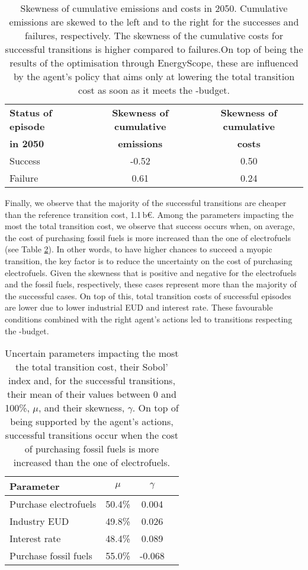 \begin{table}[htbp!]
\caption{Skewness of cumulative emissions and costs in 2050. Cumulative emissions are skewed to the left and to the right for the successes and failures, respectively. The skewness of the cumulative costs for successful transitions is higher compared to failures.On top of being the results of the optimisation through EnergyScope, these are influenced by the agent's policy that aims only at lowering the total transition cost as soon as it meets the -budget.}
\label{tab:skewness_gwp_cost}
\centering
\begin{tabular}{l c c}
\toprule
\textbf{Status of episode}  & \textbf{Skewness of cumulative} & \textbf{Skewness of cumulative} \\
\textbf{in 2050}  & \textbf{emissions} & \textbf{costs} \\	
\midrule
Success & -0.52 & 0.50 \\
Failure & 0.61 & 0.24 \\
\bottomrule							

\end{tabular}
\end{table}

Finally, we observe that the majority of the successful transitions are cheaper than the reference transition cost, 1.1\,b€. Among the parameters impacting the most the total transition cost, we observe that success occurs when, on average,  the cost of purchasing fossil fuels is more increased than the one of electrofuels (see Table \ref{tab:param_RL}). In other words, to have higher chances to succeed a myopic transition, the key factor is to reduce the uncertainty on the cost of purchasing electrofuels. Given the skewness that is positive and negative for the electrofuels and the fossil fuels, respectively, these cases represent more than the majority of the successful cases. On top of this, total transition costs of successful episodes are lower due to lower industrial \gls{EUD} and interest rate. These favourable conditions combined with the right agent's actions led to transitions respecting the -budget.

\begin{table}[htbp!]
\caption{Uncertain parameters impacting the most the total transition cost, their Sobol' index and, for the successful transitions, their mean of their values between 0 and 100\%, $\mu$, and their skewness, $\gamma$. On top of being supported by the agent's actions, successful transitions occur when the cost of purchasing fossil fuels is more increased than the one of electrofuels.}
\label{tab:param_RL}
\centering
\begin{tabular}{l c c c}
\toprule
\textbf{Parameter}  & \textbf{$\mu$} & \textbf{$\gamma$}  \\	
\midrule
Purchase electrofuels & 50.4\% & 0.004  \\
Industry EUD & 49.8\% & 0.026 \\
Interest rate & 48.4\% & 0.089\\
Purchase fossil fuels  & 55.0\% & -0.068\\
\bottomrule							

\end{tabular}
\end{table}


